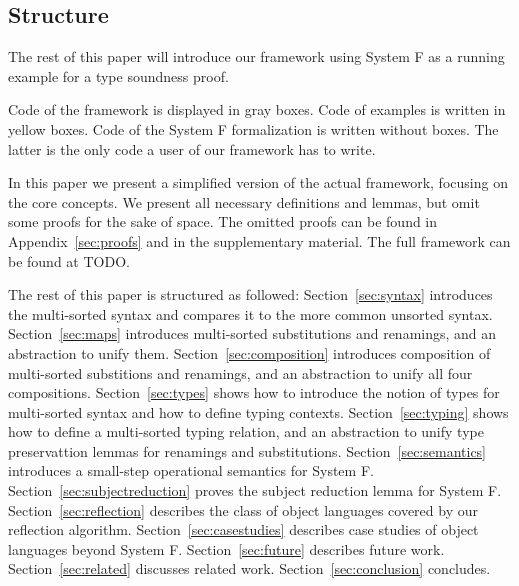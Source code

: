 \documentclass[sigplan,10pt, anonymous]{acmart}
\begin{document}
  \subsection{Structure}
  \label{sec:introduction:structure}

  The rest of this paper will introduce our framework using System F
  as a running example for a type soundness proof.

  Code of the framework is displayed in gray boxes.
  Code of examples is written in yellow boxes.
  Code of the System F formalization is written without boxes. The
  latter is the only code a user of our framework has to write.

  In this paper we present a simplified version of the actual
  framework, focusing on the core concepts. We present all necessary
  definitions and lemmas, but omit some proofs for the sake of
  space. The omitted proofs can be found in Appendix~\ref{sec:proofs}
  and in the supplementary material. The full framework can be found at
  TODO.

  The rest of this paper is structured as followed:
  Section~\ref{sec:syntax} introduces the multi-sorted syntax and compares it to the
  more common unsorted syntax.
  Section~\ref{sec:maps} introduces multi-sorted substitutions and renamings, and
  an abstraction to unify them.
  Section~\ref{sec:composition} introduces composition of multi-sorted
  substitions and renamings, and an abstraction to unify all four
  compositions.
  Section~\ref{sec:types} shows how to introduce the notion of types
  for multi-sorted syntax and how to define typing contexts.
  Section~\ref{sec:typing} shows how to define a multi-sorted typing relation,
  and an abstraction to unify type preservattion lemmas for renamings and substitutions.
  Section~\ref{sec:semantics} introduces a small-step operational semantics for System F.
  Section~\ref{sec:subjectreduction} proves the subject reduction lemma for System F.
  Section~\ref{sec:reflection} describes the class of object languages covered by
  our reflection algorithm.
  Section~\ref{sec:casestudies} describes case studies of object languages beyond System F.
  Section~\ref{sec:future} describes future work.
  Section~\ref{sec:related} discusses related work.
  Section~\ref{sec:conclusion} concludes.
\end{document}
